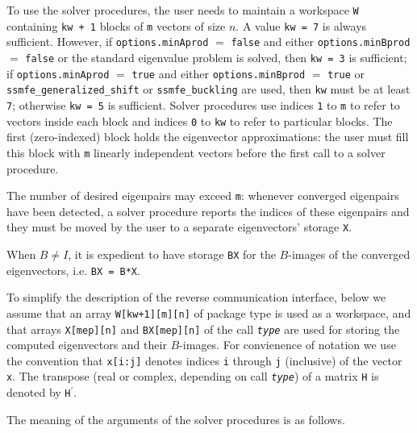 \medskip
To use the solver procedures,
the user needs to maintain a workspace {\tt W} containing
{\tt kw + 1} blocks of {\tt m} vectors of size $n$.
A value {\tt kw = 7} is always sufficient. 
However, if {\tt options.minAprod} $=$ {\tt false}
and either {\tt options.minBprod} $=$ {\tt false} or 
the standard eigenvalue problem  is solved,
then {\tt kw = 3} is sufficient; 
if 
{\tt options.minAprod} $=$ {\tt true} and
either {\tt options.minBprod} $=$ {\tt true} or
{\tt ssmfe\_generalized\_shift} or {\tt ssmfe\_buckling} are used,
then {\tt kw} must be at least {\tt 7};
otherwise {\tt kw = 5} is sufficient.
Solver procedures
use indices {\tt 1} to {\tt m} 
to refer to vectors inside each block
and indices {\tt 0} to {\tt kw} 
to refer to particular blocks.
The first (zero-indexed) block holds the eigenvector approximations:
the user must fill this block with 
{\tt m} linearly independent vectors before the first call
to a solver procedure.

The number of desired eigenpairs may exceed {\tt m}:
whenever converged eigenpairs have been detected,
a solver procedure reports the indices of these eigenpairs
and they must be moved by the user
to a separate eigenvectors' storage {\tt X}.

When $B \ne I$,
it is expedient to 
have %
storage {\tt BX}
for the $B$-images of the converged eigenvectors,
i.e. {\tt BX = B*X}.

To simplify the description of the
reverse communication interface,
below we assume that an array
{\tt W[kw+1][m][n]} of package type
is used as a workspace,
and that arrays {\tt X[mep][n]} and {\tt BX[mep][n]} of the call
\texttt{\textit{type}}
are used for storing the computed eigenvectors
and their $B$-images.
For convienence of notation we use the convention that \texttt{x[i:j]}
denotes indices {\tt i} through {\tt j} (inclusive) of the vector {\tt x}.
The transpose (real or complex, depending on call \texttt{\textit{type}})
of a matrix {\tt H} 
is denoted by {\tt H}$^\prime$.

\medskip
The meaning of the arguments of the solver procedures is as follows.

